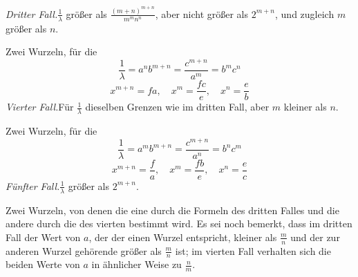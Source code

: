 \textit{Dritter Fall.}\quad $\frac{1}{\lambda}$ größer als $\frac{(m+n)^{m+n}}{m^mn^n}$, aber nicht größer als $2^{m+n}$, und zugleich
$m$ größer als $n$.

Zwei Wurzeln, für die
\[
\frac{1}{\lambda}=a^nb^{m+n}=\frac{c^{m+n}}{a^m}=b^mc^n
\]
\[
x^{m+n}=fa,\quad x^m=\frac{fc}{e},\quad x^n=\frac{e}{b}
\]
\textit{Vierter Fall.}\quad Für $\frac{1}{\lambda}$ dieselben Grenzen wie im dritten Fall, aber $m$ kleiner
als $n$.

Zwei Wurzeln, für die
\[
\frac{1}{\lambda}=a^mb^{m+n}=\frac{c^{m+n}}{a^n}=b^nc^m
\]
\[
x^{m+n}=\frac{f}{a},\quad x^m=\frac{fb}{e},\quad x^n=\frac{e}{c}
\]
\textit{Fünfter Fall.}\quad $\frac{1}{\lambda}$ größer als $2^{m+n}$.

Zwei Wurzeln, von denen die eine durch die Formeln des dritten Falles und
die andere durch die des vierten bestimmt wird.
Es sei noch bemerkt, dass im dritten Fall der Wert von $a$, der der einen Wurzel entspricht, kleiner als $\frac{m}{n}$ und der zur anderen Wurzel gehörende größer als $\frac{m}{n}$ ist; im vierten Fall verhalten sich die beiden Werte von
$a$ in ähnlicher Weise zu $\frac{n}{m}$.

